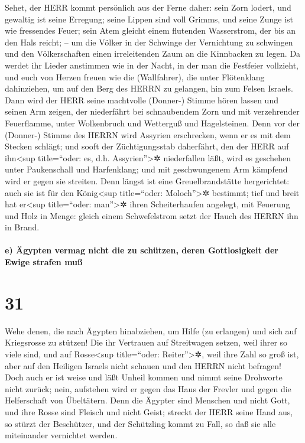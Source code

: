 Sehet, der HERR kommt persönlich aus der Ferne daher:
sein Zorn lodert, und gewaltig ist seine Erregung; seine Lippen sind
voll Grimms, und seine Zunge ist wie fressendes Feuer;
sein Atem gleicht einem flutenden Wasserstrom, der bis an
den Hals reicht; -- um die Völker in der Schwinge der Vernichtung zu
schwingen und den Völkerschaften einen irreleitenden Zaum an die
Kinnbacken zu legen. Da werdet ihr Lieder anstimmen wie
in der Nacht, in der man die Festfeier vollzieht, und euch von Herzen
freuen wie die (Wallfahrer), die unter Flötenklang dahinziehen, um auf
den Berg des HERRN zu gelangen, hin zum Felsen Israels.
Dann wird der HERR seine machtvolle (Donner-) Stimme
hören lassen und seinen Arm zeigen, der niederfährt bei schnaubendem
Zorn und mit verzehrender Feuerflamme, unter Wolkenbruch und Wetterguß
und Hagelsteinen. Denn vor der (Donner-) Stimme des HERRN
wird Assyrien erschrecken, wenn er es mit dem Stecken schlägt;
und sooft der Züchtigungsstab daherfährt, den der HERR
auf ihn\textless sup title=``oder: es, d.h. Assyrien''\textgreater✲
niederfallen läßt, wird es geschehen unter Paukenschall und Harfenklang;
und mit geschwungenem Arm kämpfend wird er gegen sie streiten.
Denn längst ist eine Greuelbrandstätte hergerichtet: auch
sie ist für den König\textless sup title=``oder: Moloch''\textgreater✲
bestimmt; tief und breit hat er\textless sup title=``oder:
man''\textgreater✲ ihren Scheiterhaufen angelegt, mit Feuerung und Holz
in Menge: gleich einem Schwefelstrom setzt der Hauch des HERRN ihn in
Brand.

\hypertarget{e-uxe4gypten-vermag-nicht-die-zu-schuxfctzen-deren-gottlosigkeit-der-ewige-strafen-muuxdf}{%
\paragraph{e) Ägypten vermag nicht die zu schützen, deren Gottlosigkeit
der Ewige strafen
muß}\label{e-uxe4gypten-vermag-nicht-die-zu-schuxfctzen-deren-gottlosigkeit-der-ewige-strafen-muuxdf}}

\hypertarget{section-30}{%
\section{31}\label{section-30}}

Wehe denen, die nach Ägypten hinabziehen, um Hilfe (zu
erlangen) und sich auf Kriegsrosse zu stützen! Die ihr Vertrauen auf
Streitwagen setzen, weil ihrer so viele sind, und auf Rosse\textless sup
title=``oder: Reiter''\textgreater✲, weil ihre Zahl so groß ist, aber
auf den Heiligen Israels nicht schauen und den HERRN nicht befragen!
Doch auch er ist weise und läßt Unheil kommen und nimmt
seine Drohworte nicht zurück; nein, aufstehen wird er gegen das Haus der
Frevler und gegen die Helferschaft von Übeltätern. Denn
die Ägypter sind Menschen und nicht Gott, und ihre Rosse sind Fleisch
und nicht Geist; streckt der HERR seine Hand aus, so stürzt der
Beschützer, und der Schützling kommt zu Fall, so daß sie alle
miteinander vernichtet werden.

